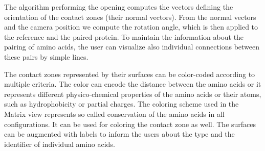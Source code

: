\documentclass{bmcart}
\def\ExpView {Exploded view\xspace}
\def\MatView {Matrix view\xspace}
\begin{document}
The algorithm performing the opening computes the vectors defining the orientation of the contact zones (their normal vectors). 
From the normal vectors and the camera position we compute the rotation angle, which is then applied to the reference and the paired protein.
To maintain the information about the pairing of amino acids, the user can visualize also individual connections between these pairs by simple lines.


The contact zones represented by their surfaces can be color-coded according to multiple criteria.
The color can encode the distance between the amino acids or it represents different physico-chemical properties of the amino acids or their atoms, such as hydrophobicity or partial charges.
The coloring scheme used in the \MatView represents so called conservation of the amino acids in all configurations.
It can be used for coloring the contact zone as well.
The surfaces can be augmented with labels to inform the users about the type and the identifier of individual amino acids.
\end{document}
